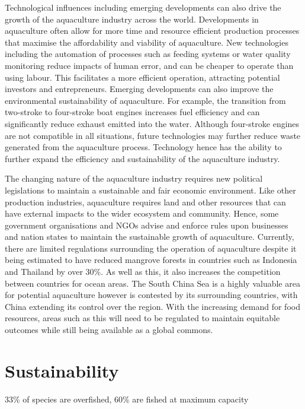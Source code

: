 	Technological influences including emerging developments can also drive the growth of the aquaculture industry across the world. Developments in aquaculture often allow for more time and resource efficient production processes that maximise the affordability and viability of aquaculture. New technologies including the automation of processes such as feeding systems or water quality monitoring reduce impacts of human error, and can be cheaper to operate than using labour. This facilitates a more efficient operation, attracting potential investors and entrepreneurs. Emerging developments can also improve the environmental sustainability of aquaculture. For example, the transition from two-stroke to four-stroke boat engines increases fuel efficiency and can significantly reduce exhaust emitted into the water. Although four-stroke engines are not compatible in all situations, future technologies may further reduce waste generated from the aquaculture process. Technology hence has the ability to further expand the efficiency and sustainability of the aquaculture industry.

	The changing nature of the aquaculture industry requires new political legislations to maintain a sustainable and fair economic environment. Like other production industries, aquaculture requires land and other resources that can have external impacts to the wider ecosystem and community. Hence, some government organisations and NGOs advise and enforce rules upon businesses and nation states to maintain the sustainable growth of aquaculture. Currently, there are limited regulations surrounding the operation of aquaculture despite it being estimated to have reduced mangrove forests in countries such as Indonesia and Thailand by over 30\%. As well as this, it also increases the competition between countries for ocean areas. The South China Sea is a highly valuable area for potential aquaculture however is contested by its surrounding countries, with China extending its control over the region. With the increasing demand for food resources, areas such as this will need to be regulated to maintain equitable outcomes while still being available as a global commons.

\section{Sustainability} \label{14/11/2024}
	33\% of species are overfished, 60\% are fished at maximum capacity

